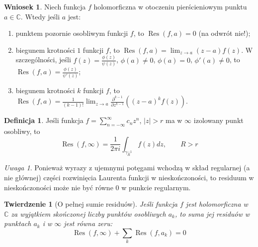 \documentclass[11pt]{article}
\newcommand{\abs}[1]{\left|#1\right|} %
\newcommand{\res}{\mathop{\text{Res}}\limits} %
\theoremstyle{plain}
\newtheorem*{theorem}{Twierdzenie}
\theoremstyle{definition}
\newtheorem*{definition}{Definicja}
\newtheorem*{corollary}{Wniosek}
\theoremstyle{remark}
\newtheorem*{remark}{Uwaga}
\begin{document}
\begin{corollary}
  Niech funkcja $ f $ holomorficzna w otoczeniu pierścieniowym punktu $ a \in \mathbb{C} $. Wtedy jeśli $ a $ jest:
  \begin{enumerate}
    \item punktem pozornie osobliwym funkcji $f$, to $ \res(f, a) = 0 $ (na odwrót nie!);
    \item biegunem krotności $ 1 $ funkcji $ f $, to $ \res(f, a) = \lim_{z \to a} (z-a)f(z) $.
    W szczególności, jeśli $ f(z) = \frac{\phi(z)}{\psi(z)} $, $ \phi(a) \neq 0 $, $ \phi(a) = 0 $, $ \phi'(a) \neq 0 $, to $ \res(f, a) = \frac{\phi(z)}{\psi'(z)} $;
    \item biegunem krotności $k$ funkcji $f$, to $ \res(f, a) = \frac{1}{(k-1)!} \lim_{z \to a} \frac{\partial^{k-1}}{\partial z^{k-1}}\left( (z-a)^k f(z) \right)$.
  \end{enumerate}
  
\end{corollary}

\begin{definition}
  Jeśli funkcja $ f = \sum_{n=-\infty}^{\infty} c_n z^n $, $ \abs{z} > r $ ma w $ \infty $ izolowany punkt osobliwy, to
  $$
    \res(f, \infty) = \frac{1}{2 \pi i} \int_{\gamma_R^{-1}} f(z) dz,
    \qquad R > r
  $$
\end{definition}

\begin{remark}
   Ponieważ wyrazy z ujemnymi potęgami wchodzą w skład regularnej (a nie głównej) części rozwinięcia Laurenta funkcji w nieskończoności, to residuum w nieskończoności może nie być równe $0$ w punkcie regularnym.
\end{remark}

\begin{theorem}[O pełnej sumie residuów]
  Jeśli funkcja $f$ jest holomorficzna w $ \mathbb{C} $ za wyjątkiem skończonej liczby punktów osobliwych $ a_k $,
  to suma jej residuów w punktach $ a_k $ i w $ \infty $ jest równa zeru:
  $$
    \res(f, \infty) + \sum_k \res(f, a_k) = 0
  $$
\end{theorem}
\end{document}

